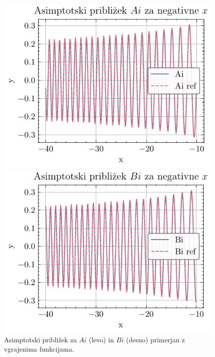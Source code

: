 \documentclass[slovene,11pt,a4paper]{article}
\begin{document}
\begin{figure}[h]
  \centering
  \begin{minipage}{0.48\textwidth}
    \centering
    \includegraphics[width=\linewidth]{graphs/neg_draw_ai.pdf}
  \end{minipage}\hfill
  \begin{minipage}{0.48\textwidth}
    \centering
    \includegraphics[width=\linewidth]{graphs/neg_draw_bi.pdf}
  \end{minipage}
  \caption{Asimptotski približek za $Ai$ (levo) in $Bi$ (desno) primerjan z vgrajenima funkcijama.}
  \label{fig: neg_draw}
\end{figure}
\end{document}
